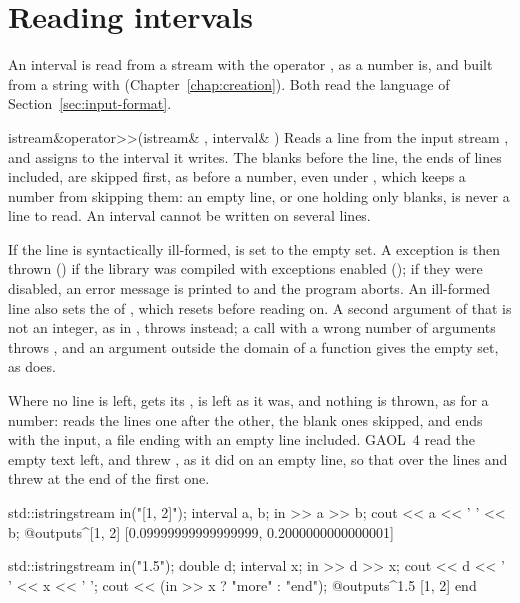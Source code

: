\section{Reading intervals}\label{sec:reading-intervals}

An interval is read from a stream with the operator \code{>{}>}, as a number
is, and built from a string with 
(Chapter~\ref{chap:creation}). Both read the language of
Section~\ref{sec:input-format}.
%

\begin{deffun}{istream\&}{operator>{}>}{(istream\& , interval\& )}
  Reads a line from the input stream , and assigns to  the
  interval it writes. The blanks before the line, the ends of lines
  included, are skipped first, as before a number, even under
  , which keeps a number from skipping them: an empty
  line, or one holding only blanks, is never a line to read. An interval
  cannot be written on several lines.

  If the line is syntactically ill-formed,  is set to the empty set.
  A  exception is then thrown
  () if the library was compiled with exceptions
  enabled (); if they were disabled, an error
  message is printed to  and the program aborts. An ill-formed
  line also sets the  of , which 
  resets before reading on. A second argument of  that is not an integer, as in
  , throws  instead; a call with
  a wrong number of arguments throws , and an
  argument outside the domain of a function gives the empty set, as
   does.

  Where no line is left,  gets its ,  is left
  as it was, and nothing is thrown, as for a number: 
  reads the lines one after the other, the blank ones skipped, and ends with
  the input, a file ending with an empty line included.\newinvfive{} GAOL~4
  read the empty text left, and threw , as it did
  on an empty line, so that  over the lines
   and \code{[1, 2]} threw at the end of the first one.
\begin{example}
std::istringstream in("[1, 2]\n[0.1, 0.2]\n");
interval a, b;
in >> a >> b;
cout << a << ' ' << b;
@outputs^[1, 2] [0.09999999999999999, 0.2000000000000001]~
\end{example}
\begin{example}
std::istringstream in("1.5\n\n[1, 2]\n\n");
double d;
interval x;
in >> d >> x;
cout << d << ' ' << x << ' ';
cout << (in >> x ? "more" : "end");
@outputs^1.5 [1, 2] end~
\end{example}
\end{deffun}

